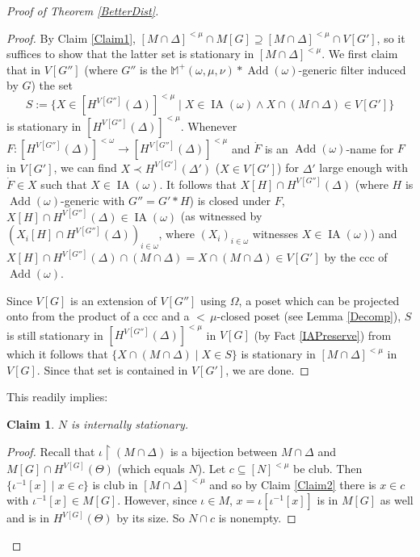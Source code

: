 \documentclass[12pt]{amsart}
\theoremstyle{definition}
\theoremstyle{remark}
\theoremstyle{plain}
\newtheorem{myclaim}{Claim}
\numberwithin{mydef}{section}
\DeclareMathOperator{\Add}{Add}
\DeclareMathOperator{\IA}{IA}
\newcommand{\dM}{\mathbb{M}}
\newcommand{\uhr}{\upharpoonright}
\begin{document}
\begin{proof}[Proof of Theorem \ref{BetterDist}]
		\begin{proof}
			By Claim \ref{Claim1}, $[M\cap\Delta]^{<\mu}\cap M[G]\supseteq[M\cap\Delta]^{<\mu}\cap V[G']$, so it suffices to show that the latter set is stationary in $[M\cap\Delta]^{<\mu}$. We first claim that in $V[G'']$ (where $G''$ is the $\dM^+(\omega,\mu,\nu)*\Add(\omega)$-generic filter induced by $G$) the set
			$$S:=\{X\in[H^{V[G'']}(\Delta)]^{<\mu}\;|\;X\in\IA(\omega)\wedge X\cap(M\cap\Delta)\in V[G']\}$$
			is stationary in $[H^{V[G'']}(\Delta)]^{<\mu}$. Whenever $F\colon[H^{V[G'']}(\Delta)]^{<\omega}\to[H^{V[G'']}(\Delta)]^{<\mu}$ and $\dot{F}$ is an $\Add(\omega)$-name for $F$ in $V[G']$, we can find $X\prec H^{V[G']}(\Delta')$ ($X\in V[G']$) for $\Delta'$ large enough with $\dot{F}\in X$ such that $X\in\IA(\omega)$. It follows that $X[H]\cap H^{V[G'']}(\Delta)$ (where $H$ is $\Add(\omega)$-generic with $G''=G'*H$) is closed under $F$, $X[H]\cap H^{V[G'']}(\Delta)\in\IA(\omega)$ (as witnessed by $(X_i[H]\cap H^{V[G'']}(\Delta))_{i\in\omega}$, where $(X_i)_{i\in\omega}$ witnesses $X\in\IA(\omega)$) and $X[H]\cap H^{V[G'']}(\Delta)\cap(M\cap\Delta)=X\cap(M\cap\Delta)\in V[G']$ by the ccc of $\Add(\omega)$.
			
			Since $V[G]$ is an extension of $V[G'']$ using $\Omega$, a poset which can be projected onto from the product of a ccc and a ${<}\,\mu$-closed poset (see Lemma \ref{Decomp}), $S$ is still stationary in $[H^{V[G'']}(\Delta)]^{<\mu}$ in $V[G]$ (by Fact \ref{IAPreserve}) from which it follows that $\{X\cap(M\cap\Delta)\;|\;X\in S\}$ is stationary in $[M\cap\Delta]^{<\mu}$ in $V[G]$. Since that set is contained in $V[G']$, we are done.
		\end{proof}
		
		This readily implies:
		
		\begin{myclaim}
			$N$ is internally stationary.
		\end{myclaim}
		
		\begin{proof}
			Recall that $\iota\uhr(M\cap\Delta)$ is a bijection between $M\cap\Delta$ and $M[G]\cap H^{V[G]}(\Theta)$ (which equals $N$). Let $c\subseteq[N]^{<\mu}$ be club. Then $\{\iota^{-1}[x]\;|\;x\in c\}$ is club in $[M\cap\Delta]^{<\mu}$ and so by Claim \ref{Claim2} there is $x\in c$ with $\iota^{-1}[x]\in M[G]$. However, since $\iota\in M$, $x=\iota[\iota^{-1}[x]]$ is in $M[G]$ as well and is in $H^{V[G]}(\Theta)$ by its size. So $N\cap c$ is nonempty.
		\end{proof}
		

\end{proof}
\end{document}
